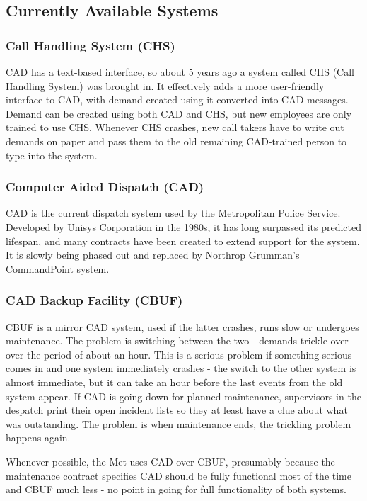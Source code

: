 \documentclass{article}
\begin{document}
    \subsection{Currently Available Systems}
\subsubsection{Call Handling System (CHS)}
CAD has a text-based interface, so about 5 years ago a system called CHS (Call Handling System) was brought in. It effectively adds a more user-friendly interface to CAD, with demand created using it converted into CAD messages. Demand can be created using both CAD and CHS, but new employees are only trained to use CHS. Whenever CHS crashes, new call takers have to write out demands on paper and pass them to the old remaining CAD-trained person to type into the system.

\subsubsection{Computer Aided Dispatch (CAD)}
CAD is the current dispatch system used by the Metropolitan Police Service. Developed by Unisys Corporation in the 1980s, it has long surpassed its predicted lifespan, and many contracts have been created to extend support for the system. It is slowly being phased out and replaced by Northrop Grumman’s CommandPoint system.

\subsubsection{CAD Backup Facility (CBUF)}
CBUF is a mirror CAD system, used if the latter crashes, runs slow or undergoes maintenance. The problem is switching between the two - demands trickle over over the period of about an hour. This is a serious problem if something serious comes in and one system immediately crashes - the switch to the other system is almost immediate, but it can take an hour before the last events from the old system appear. If CAD is going down for planned maintenance, supervisors in the despatch print their open incident lists so they at least have a clue about what was outstanding. The problem is when maintenance ends, the trickling problem happens again.

Whenever possible, the Met uses CAD over CBUF, presumably because the maintenance contract specifies CAD should be fully functional most of the time and CBUF much less - no point in going for full functionality of both systems.
\end{document}
